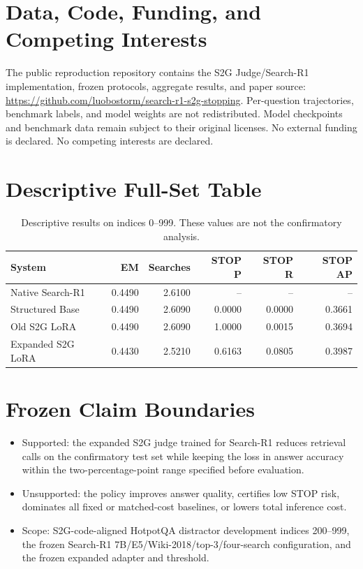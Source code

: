 \documentclass[11pt,a4paper]{article}
\begin{document}
\section*{Data, Code, Funding, and Competing Interests}

The public reproduction repository contains the S2G Judge/Search-R1 implementation, frozen protocols, aggregate results, and paper source: \url{https://github.com/luobostorm/search-r1-s2g-stopping}. Per-question trajectories, benchmark labels, and model weights are not redistributed. Model checkpoints and benchmark data remain subject to their original licenses. No external funding is declared. No competing interests are declared.




\appendix
\section{Descriptive Full-Set Table}

\begin{table}[H]
\centering
\small
\caption{Descriptive results on indices 0--999. These values are not the confirmatory analysis.}
\begin{tabular}{lrrrrr}
\toprule
System & EM & Searches & STOP P & STOP R & STOP AP \\
\midrule
Native Search-R1 & 0.4490 & 2.6100 & -- & -- & -- \\
Structured Base & 0.4490 & 2.6090 & 0.0000 & 0.0000 & 0.3661 \\
Old S2G LoRA & 0.4490 & 2.6090 & 1.0000 & 0.0015 & 0.3694 \\
Expanded S2G LoRA & 0.4430 & 2.5210 & 0.6163 & 0.0805 & 0.3987 \\
\bottomrule
\end{tabular}
\end{table}

\section{Frozen Claim Boundaries}

\begin{itemize}[leftmargin=*]
  \item Supported: the expanded S2G judge trained for Search-R1 reduces retrieval calls on the confirmatory test set while keeping the loss in answer accuracy within the two-percentage-point range specified before evaluation.
  \item Unsupported: the policy improves answer quality, certifies low STOP risk, dominates all fixed or matched-cost baselines, or lowers total inference cost.
  \item Scope: S2G-code-aligned HotpotQA distractor development indices 200--999, the frozen Search-R1 7B/E5/Wiki-2018/top-3/four-search configuration, and the frozen expanded adapter and threshold.
\end{itemize}
\end{document}
